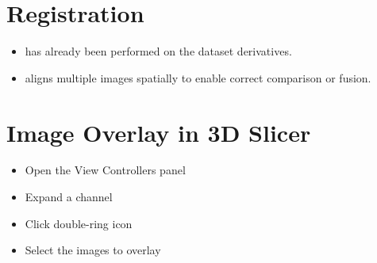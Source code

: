 \documentclass[a4paper,12pt]{article}
\begin{document}
\section*{Registration}
\begin{itemize}[leftmargin=1.5em]
    \item has already been performed on the dataset derivatives.
    \item aligns multiple images spatially to enable correct comparison or fusion.
\end{itemize}

\section*{Image Overlay in 3D Slicer}
\begin{itemize}[leftmargin=1.5em]
    \item Open the View Controllers panel
    \item Expand a channel
    \item Click double-ring icon
    \item Select the images to overlay
\end{itemize}
\end{document}

